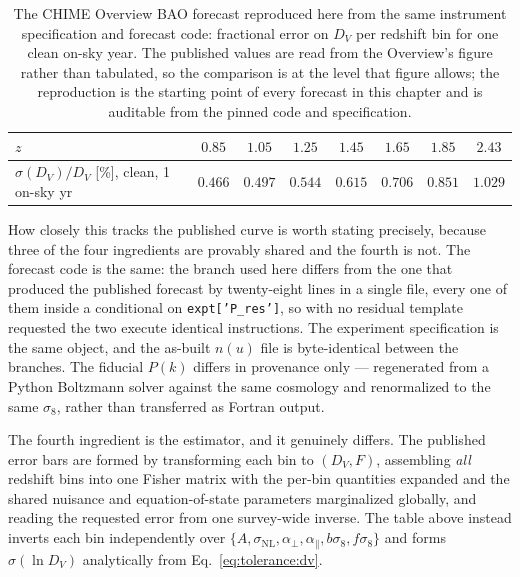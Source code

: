 \begin{table}[H]
\centering
\caption[The Overview-convention clean forecast, reproduced]{The CHIME Overview BAO forecast reproduced here from the same instrument specification and forecast code: fractional error on $D_V$ per redshift bin for one clean on-sky year. The published values are read from the Overview's figure rather than tabulated, so the comparison is at the level that figure allows; the reproduction is the starting point of every forecast in this chapter and is auditable from the pinned code and specification.}
\label{tab:tolerance:overview}
\begin{tabular}{lccccccc}
\toprule
$z$ & $0.85$ & $1.05$ & $1.25$ & $1.45$ & $1.65$ & $1.85$ & $2.43$ \\
\midrule
$\sigma(D_V)/D_V$ [\%], clean, 1 on-sky yr & $0.466$ & $0.497$ & $0.544$ & $0.615$ & $0.706$ & $0.851$ & $1.029$ \\
\bottomrule
\end{tabular}
\end{table}

How closely this tracks the published curve is worth stating precisely, because three of the four ingredients are provably shared and the fourth is not. The forecast code is the same: the branch used here differs from the one that produced the published forecast by twenty-eight lines in a single file, every one of them inside a conditional on \texttt{expt['P\_res']}, so with no residual template requested the two execute identical instructions. The experiment specification is the same object, and the as-built $n(u)$ file is byte-identical between the branches. The fiducial $P(k)$ differs in provenance only --- regenerated from a Python Boltzmann solver against the same cosmology and renormalized to the same $\sigma_8$, rather than transferred as Fortran output.

The fourth ingredient is the estimator, and it genuinely differs. The published
error bars are formed by transforming each bin to $(D_V,F)$, assembling
\emph{all} redshift bins into one Fisher matrix with the per-bin quantities
expanded and the shared nuisance and equation-of-state parameters marginalized
globally, and reading the requested error from one survey-wide inverse. The
table above instead inverts each bin independently over
$\{A,\sigma_{\text{NL}},\alpha_\perp,\alpha_\parallel,b\sigma_8,f\sigma_8\}$
and forms $\sigma(\ln D_V)$ analytically from Eq.~\eqref{eq:tolerance:dv}.

